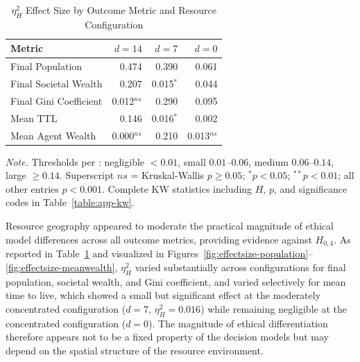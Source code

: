 \documentclass{icsthesis}
\begin{document}
\begin{mainmatter}
		\begin{table}[H]
		\vspace{2ex}
		\centering
		\caption{$\eta^2_H$ Effect Size by Outcome Metric and Resource Configuration}
		\label{table:effect-sizes}
		\footnotesize
		\renewcommand{\arraystretch}{1.3}
		\begin{tabular}{
			>{\raggedright\arraybackslash}p{3.8cm}
			r r r
		}
		\hline\hline
		\textbf{Metric} & $d = 14$ & $d = 7$ & $d = 0$ \\
		\hline
		Final Population       & 0.474 & 0.390 & 0.061 \\
		Final Societal Wealth  & 0.207 & 0.015$^{*}$ & 0.044 \\
		Final Gini Coefficient & 0.012$^{ns}$ & 0.290 & 0.095 \\
		Mean TTL               & 0.146 & 0.016$^{*}$ & 0.002 \\
		Mean Agent Wealth      & 0.000$^{ns}$ & 0.210 & 0.013$^{ns}$ \\
		\hline
		\end{tabular}
		\par\smallskip
		{\footnotesize\noindent\textit{Note.} Thresholds per \citet{Tomczak2014}: negligible $< 0.01$, small $0.01$--$0.06$, medium $0.06$--$0.14$, large $\geq 0.14$. Superscript $ns$ = Kruskal-Wallis $p \geq 0.05$; $^{*}p < 0.05$; $^{**}p < 0.01$; all other entries $p < 0.001$. Complete KW statistics including $H$, $p$, and significance codes in Table~\ref{table:app-kw}.}
		\end{table}

Resource geography appeared to moderate the practical magnitude of ethical model differences across all outcome metrics, providing evidence against $H_{0,4}$. As reported in Table~\ref{table:effect-sizes} and visualized in Figures~\ref{fig:effectsize-population}--\ref{fig:effectsize-meanwealth}, $\eta^2_H$ varied substantially across configurations for final population, societal wealth, and Gini coefficient, and varied selectively for mean time to live, which showed a small but significant effect at the moderately concentrated configuration ($d = 7$, $\eta^2_H = 0.016$) while remaining negligible at the concentrated configuration ($d = 0$). The magnitude of ethical differentiation therefore appears not to be a fixed property of the decision models but may depend on the spatial structure of the resource environment.


\end{mainmatter}
\end{document}
